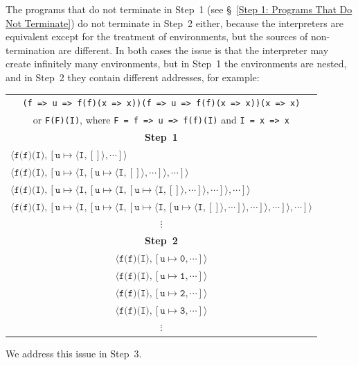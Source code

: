 \documentclass[12pt, oneside]{book}
\begin{document}
The programs that do not terminate in Step~1 (see §~\ref{Step 1: Programs That Do Not Terminate}) do not terminate in Step~2 either, because the interpreters are equivalent except for the treatment of environments, but the sources of non-termination are different. In both cases the issue is that the interpreter may create infinitely many environments, but in Step~1 the environments are nested, and in Step~2 they contain different addresses, for example:

\begin{center}
\begin{tabular}{l}
\multicolumn{1}{c}{\texttt{(f => u => f(f)(x => x))(f => u => f(f)(x => x))(x => x)}} \\
\multicolumn{1}{c}{or \texttt{F(F)(I)}, where \texttt{F = f => u => f(f)(I)} and \texttt{I = x => x}} \\
\multicolumn{1}{c}{\textbf{Step~1}} \\
$\langle \texttt{f(f)(I)}, [\texttt{u} \mapsto \langle \texttt{I}, [] \rangle, \cdots] \rangle$ \\
$\langle \texttt{f(f)(I)}, [\texttt{u} \mapsto \langle \texttt{I}, [\texttt{u} \mapsto \langle \texttt{I}, [] \rangle, \cdots] \rangle, \cdots] \rangle$ \\
$\langle \texttt{f(f)(I)}, [\texttt{u} \mapsto \langle \texttt{I}, [\texttt{u} \mapsto \langle \texttt{I}, [\texttt{u} \mapsto \langle \texttt{I}, [] \rangle, \cdots] \rangle, \cdots] \rangle, \cdots] \rangle$ \\
$\langle \texttt{f(f)(I)}, [\texttt{u} \mapsto \langle \texttt{I}, [\texttt{u} \mapsto \langle \texttt{I}, [\texttt{u} \mapsto \langle \texttt{I}, [\texttt{u} \mapsto \langle \texttt{I}, [] \rangle, \cdots] \rangle, \cdots] \rangle, \cdots] \rangle, \cdots] \rangle$ \\
\multicolumn{1}{c}{$\vdots$} \\
\multicolumn{1}{c}{\textbf{Step~2}} \\
\multicolumn{1}{c}{$\langle \texttt{f(f)(I)}, [\texttt{u} \mapsto \texttt{0}, \cdots] \rangle$} \\
\multicolumn{1}{c}{$\langle \texttt{f(f)(I)}, [\texttt{u} \mapsto \texttt{1}, \cdots] \rangle$} \\
\multicolumn{1}{c}{$\langle \texttt{f(f)(I)}, [\texttt{u} \mapsto \texttt{2}, \cdots] \rangle$} \\
\multicolumn{1}{c}{$\langle \texttt{f(f)(I)}, [\texttt{u} \mapsto \texttt{3}, \cdots] \rangle$} \\
\multicolumn{1}{c}{$\vdots$} \\
\end{tabular}
\end{center}

We address this issue in Step~3.


\backmatter




\end{document}
